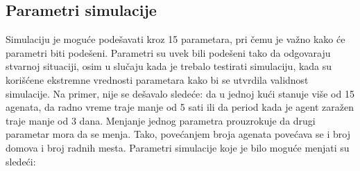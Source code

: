 \subsection{Parametri simulacije}

Simulaciju je moguće podešavati kroz 15 parametara, pri čemu je važno kako će
parametri biti podešeni. Parametri su uvek bili podešeni tako da odgovaraju stvarnoj
situaciji, osim u slučaju kada je trebalo testirati simulaciju, kada su korišćene ekstremne
vrednosti parametara kako bi se utvrdila validnost simulacije. Na primer, nije se
dešavalo sledeće: da u jednoj kući stanuje više od 15 agenata, da radno vreme traje
manje od 5 sati ili da period kada je agent zaražen traje manje od 3 dana. Menjanje
jednog parametra prouzrokuje da drugi parametar mora da se menja. Tako,
povećanjem broja agenata povećava se i broj domova i broj radnih mesta. Parametri
simulacije koje je bilo moguće menjati su sledeći:

